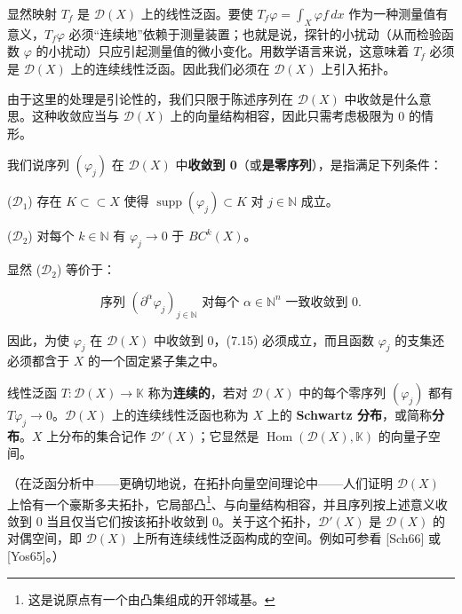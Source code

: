 显然映射 $ T_{f} $ 是 $ \mathcal{D}(X) $ 上的线性泛函。要使 $ T_{f}\varphi = \int_{X}\varphi f\,dx $ 作为一种测量值有意义，$ T_{f}\varphi $ 必须“连续地”依赖于测量装置；也就是说，探针的小扰动（从而检验函数 $ \varphi $ 的小扰动）只应引起测量值的微小变化。用数学语言来说，这意味着 $ T_{f} $ 必须是 $ \mathcal{D}(X) $ 上的连续线性泛函。因此我们必须在 $ \mathcal{D}(X) $ 上引入拓扑。

由于这里的处理是引论性的，我们只限于陈述序列在 $ \mathcal{D}(X) $ 中收敛是什么意思。这种收敛应当与 $ \mathcal{D}(X) $ 上的向量结构相容，因此只需考虑极限为 0 的情形。

我们说序列 $ (\varphi_{j}) $ 在 $ \mathcal{D}(X) $ 中\textbf{收敛到 0}（或\textbf{是零序列}），是指满足下列条件：

($ \mathcal{D}_{1} $) 存在 $ K \subset\subset X $ 使得 $ \operatorname{supp}(\varphi_{j}) \subset K $ 对 $ j \in \mathbb{N} $ 成立。

($ \mathcal{D}_{2} $) 对每个 $ k \in \mathbb{N} $ 有 $ \varphi_{j} \to 0 $ 于 $ BC^{k}(X) $。

显然 ($ \mathcal{D}_{2} $) 等价于：

\begin{equation}
\text{序列 } (\partial^{\alpha}\varphi_{j})_{j\in\mathbb{N}} \text{ 对每个 } \alpha \in \mathbb{N}^{n} \text{ 一致收敛到 } 0.\tag{7.15}
\end{equation}

因此，为使 $ \varphi_{j} $ 在 $ \mathcal{D}(X) $ 中收敛到 0，(7.15) 必须成立，而且函数 $ \varphi_{j} $ 的支集还必须都含于 $ X $ 的一个固定紧子集之中。

线性泛函 $ T : \mathcal{D}(X) \to \mathbb{K} $ 称为\textbf{连续的}，若对 $ \mathcal{D}(X) $ 中的每个零序列 $ (\varphi_{j}) $ 都有 $ T\varphi_{j} \to 0 $。$ \mathcal{D}(X) $ 上的连续线性泛函也称为 $ X $ 上的 \textbf{Schwartz 分布}，或简称\textbf{分布}。$ X $ 上分布的集合记作 $ \mathcal{D}'(X) $；它显然是 $ \operatorname{Hom}(\mathcal{D}(X),\mathbb{K}) $ 的向量子空间。

（在泛函分析中——更确切地说，在拓扑向量空间理论中——人们证明 $ \mathcal{D}(X) $ 上恰有一个豪斯多夫拓扑，它局部凸\footnote{这是说原点有一个由凸集组成的开邻域基。}、与向量结构相容，并且序列按上述意义收敛到 0 当且仅当它们按该拓扑收敛到 0。关于这个拓扑，$ \mathcal{D}'(X) $ 是 $ \mathcal{D}(X) $ 的对偶空间，即 $ \mathcal{D}(X) $ 上所有连续线性泛函构成的空间。例如可参看 [Sch66] 或 [Yos65]。）

